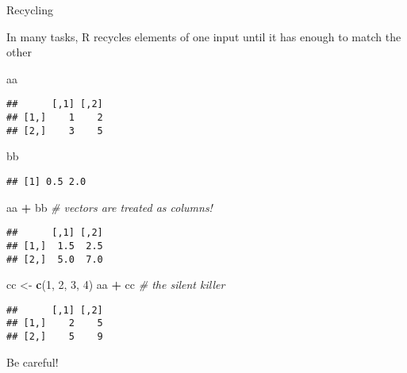 \documentclass[ignorenonframetext,]{beamer}
\newenvironment{Shaded}{\begin{snugshade}}{\end{snugshade}}
\newcommand{\CommentTok}[1]{\textcolor[rgb]{0.56,0.35,0.01}{\textit{#1}}}
\newcommand{\DecValTok}[1]{\textcolor[rgb]{0.00,0.00,0.81}{#1}}
\newcommand{\KeywordTok}[1]{\textcolor[rgb]{0.13,0.29,0.53}{\textbf{#1}}}
\newcommand{\NormalTok}[1]{#1}
\newcommand{\OperatorTok}[1]{\textcolor[rgb]{0.81,0.36,0.00}{\textbf{#1}}}
\newcommand{\StringTok}[1]{\textcolor[rgb]{0.31,0.60,0.02}{#1}}
\begin{document}
\begin{frame}[fragile]{Recycling}
\protect\hypertarget{recycling}{}

In many tasks, R recycles elements of one input until it has enough to
match the other

\footnotesize

\begin{Shaded}
\begin{Highlighting}[]
\NormalTok{aa}
\end{Highlighting}
\end{Shaded}

\begin{verbatim}
##      [,1] [,2]
## [1,]    1    2
## [2,]    3    5
\end{verbatim}

\begin{Shaded}
\begin{Highlighting}[]
\NormalTok{bb}
\end{Highlighting}
\end{Shaded}

\begin{verbatim}
## [1] 0.5 2.0
\end{verbatim}

\begin{Shaded}
\begin{Highlighting}[]
\NormalTok{aa }\OperatorTok{+}\StringTok{ }\NormalTok{bb }\CommentTok{# vectors are treated as columns!}
\end{Highlighting}
\end{Shaded}

\begin{verbatim}
##      [,1] [,2]
## [1,]  1.5  2.5
## [2,]  5.0  7.0
\end{verbatim}

\begin{Shaded}
\begin{Highlighting}[]
\NormalTok{cc <-}\StringTok{ }\KeywordTok{c}\NormalTok{(}\DecValTok{1}\NormalTok{, }\DecValTok{2}\NormalTok{, }\DecValTok{3}\NormalTok{, }\DecValTok{4}\NormalTok{)}
\NormalTok{aa }\OperatorTok{+}\StringTok{ }\NormalTok{cc }\CommentTok{# the silent killer}
\end{Highlighting}
\end{Shaded}

\begin{verbatim}
##      [,1] [,2]
## [1,]    2    5
## [2,]    5    9
\end{verbatim}

Be careful!

\end{frame}
\end{document}
